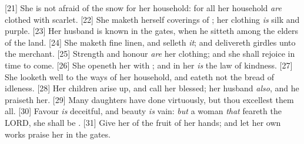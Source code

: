 [21] \textcolor[cmyk]{0.99998,1,0,0}{She is not afraid of the snow for her household: for all her household \emph{are} clothed with scarlet.}
[22] \textcolor[cmyk]{0.99998,1,0,0}{She maketh herself coverings of ; her clothing \emph{is} silk and purple.}
[23] \textcolor[cmyk]{0.99998,1,0,0}{Her husband is known in the gates, when he sitteth among the elders of the land.}
[24] \textcolor[cmyk]{0.99998,1,0,0}{She maketh fine linen, and selleth \emph{it}; and delivereth girdles unto the merchant.}
[25] \textcolor[cmyk]{0.99998,1,0,0}{Strength and honour \emph{are} her clothing; and she shall rejoice in time to come.}
[26] \textcolor[cmyk]{0.99998,1,0,0}{She openeth her  with ; and in her  \emph{is} the law of kindness.}
[27] \textcolor[cmyk]{0.99998,1,0,0}{She looketh well to the ways of her household, and eateth not the bread of idleness.}
[28] \textcolor[cmyk]{0.99998,1,0,0}{Her children arise up, and call her blessed; her husband \emph{also}, and he praiseth her.}
[29] \textcolor[cmyk]{0.99998,1,0,0}{Many daughters have done virtuously, but thou excellest them all.}
[30] \textcolor[cmyk]{0.99998,1,0,0}{Favour \emph{is} deceitful, and beauty \emph{is} vain: \emph{but} a woman \emph{that} feareth the LORD, she shall be .}
[31] \textcolor[cmyk]{0.99998,1,0,0}{Give her of the fruit of her hands; and let her own works praise her in the gates.}




